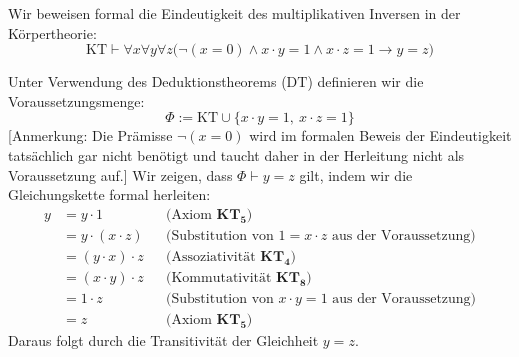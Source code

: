\begin{math-stroke}
Wir beweisen formal die Eindeutigkeit des multiplikativen Inversen in der Körpertheorie:
\[ \text{KT} \vdash \forall x \forall y \forall z \bigl(\neg(x = 0) \wedge x \cdot y = 1 \wedge x \cdot z = 1 \rightarrow y = z\bigr) \]

\begin{short-proof}
Unter Verwendung des Deduktionstheorems ($\text{DT}$) definieren wir die Voraussetzungsmenge:
\[ \Phi := \text{KT} \cup \{x \cdot y = 1, \ x \cdot z = 1\} \]
[Anmerkung: Die Prämisse $\neg(x=0)$ wird im formalen Beweis der Eindeutigkeit tatsächlich gar nicht benötigt und taucht daher in der Herleitung nicht als Voraussetzung auf.]
Wir zeigen, dass $\Phi \vdash y = z$ gilt, indem wir die Gleichungskette formal herleiten:
\begin{align*}
y &= y \cdot 1 && \text{(Axiom $\mathbf{KT_5}$)} \\
&= y \cdot (x \cdot z) && \text{(Substitution von $1 = x \cdot z$ aus der Voraussetzung)} \\
&= (y \cdot x) \cdot z && \text{(Assoziativität $\mathbf{KT_4}$)} \\
&= (x \cdot y) \cdot z && \text{(Kommutativität $\mathbf{KT_8}$)} \\
&= 1 \cdot z && \text{(Substitution von $x \cdot y = 1$ aus der Voraussetzung)} \\
&= z && \text{(Axiom $\mathbf{KT_5}$)}
\end{align*}
Daraus folgt durch die Transitivität der Gleichheit $y = z$.
\end{short-proof}
\end{math-stroke}

